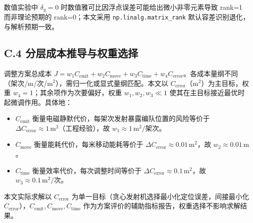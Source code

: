 \documentclass[12pt,a4paper]{ctexart}
\newcommand{\unit}[1]{\ensuremath{\,\mathrm{#1}}}
\begin{document}
数值实验中 $\delta_y=0$ 时数值雅可比因浮点误差可能给出微小非零元素导致 rank=1 而非理论预期的 rank=0；本文采用 \texttt{np.linalg.matrix\_rank} 默认容差识别退化，与解析预期一致。

\subsection*{C.4 分层成本推导与权重选择}

调整方案总成本 $J=w_1 C_{\text{emit}}+w_2 C_{\text{move}}+w_3 C_{\text{time}}+w_4 C_{\text{error}}$。各成本量纲不同（架次/m/次/m$^2$），需归一化或显式量纲匹配。本文以 $C_{\text{error}}$（m$^2$）为主目标，权重 $w_4=1$；其余项作为次要偏好，权重 $w_1,w_2,w_3\ll 1$ 使其在主目标接近最优时起微调作用。具体地：
\begin{itemize}
    \item $C_{\text{emit}}$ 衡量电磁静默代价，每架次发射暴露编队位置的风险等价于 $\Delta C_{\text{error}}\approx 1\unit{m}^2$（工程经验），故 $w_1\approx 1\unit{m}^2/\text{架次}$。
    \item $C_{\text{move}}$ 衡量能耗代价，每米移动能耗等价于 $\Delta C_{\text{error}}\approx 0.01\unit{m}^2$，故 $w_2\approx 0.01\unit{m}$。
    \item $C_{\text{time}}$ 衡量效率代价，每次调整时间等价于 $\Delta C_{\text{error}}\approx 0.1\unit{m}^2$，故 $w_3\approx 0.1\unit{m}^2/\text{次}$。
\end{itemize}
本文实际求解以 $C_{\text{error}}$ 为单一目标（贪心发射机选择最小化定位误差，间接最小化 $C_{\text{error}}$），$C_{\text{emit}},C_{\text{move}},C_{\text{time}}$ 作为方案评价的辅助指标报告，权重选择不影响求解结果。
\end{document}
